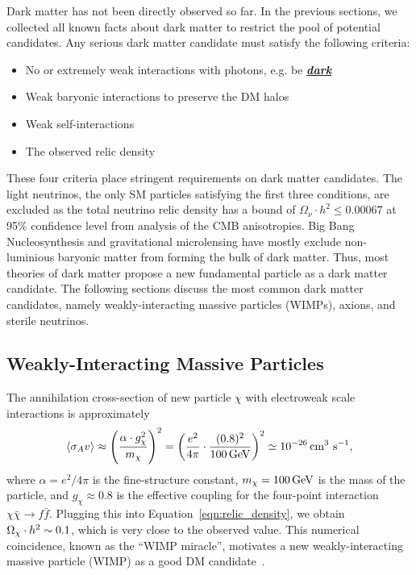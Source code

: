 Dark matter has not been directly observed so far.
In the previous sections, we collected all known facts about dark matter to restrict the pool of potential candidates. 
Any serious dark matter candidate must satisfy the following criteria:
\begin{itemize}
\item No or extremely weak interactions with photons, e.g. be \underline{\textbf{\textit{dark}}}
\item Weak baryonic interactions to preserve the DM halos
\item Weak self-interactions
\item The observed relic density
\end{itemize}
These four criteria place stringent requirements on dark matter candidates.
The light neutrinos, the only SM particles satisfying the first three conditions, are excluded as the total neutrino relic density has a bound of $\Omega_\nu \cdot h^2 \leq 0.00067$ at 95\% confidence level from analysis of the CMB anisotropies.
Big Bang Nucleosynthesis and gravitational microlensing have mostly exclude non-luminious baryonic matter from forming the bulk of dark matter.
Thus, most theories of dark matter propose a new fundamental particle as a dark matter candidate.
The following sections discuss the most common dark matter candidates, namely weakly-interacting massive particles (WIMPs), axions, and sterile neutrinos.

\subsection{Weakly-Interacting Massive Particles}
\label{sec:dm_wimp}

The annihilation cross-section of new particle $\chi$ with electroweak scale interactions is approximately
\begin{equation}
  \langle \sigma_A v \rangle \approx \left( \frac{\alpha \cdot g_\chi^2}{m_\chi} \right)^2 = \left( \frac{e^2}{4\pi} \cdot \frac{(0.8)^2}{100\,\text{Ge\hspace{-.08em}V}} \right)^2 \simeq 10^{-26} \,\text{cm}^{3}\text{ s}^{-1},
\end{equation}
where $\alpha = e^2 / 4\pi$ is the fine-structure constant, $m_\chi = 100\,\text{Ge\hspace{-.08em}V}$ is the mass of the particle, and $g_\chi \approx 0.8$ is the effective coupling for the four-point interaction $\chi \bar\chi \rightarrow f \bar f$.
Plugging this into Equation~\ref{eqn:relic_density}, we obtain $\Omega_\chi \cdot h^2 \sim 0.1$, which is very close to the observed value.
This numerical coincidence, known as the ``WIMP miracle'', motivates a new weakly-interacting massive particle (WIMP) as a good DM candidate~\cite{Jungman1996}.

